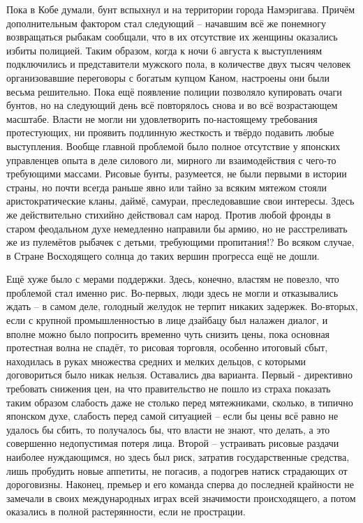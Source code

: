 Пока в Кобе думали, бунт вспыхнул и на территории города Намэригава. Причём дополнительным фактором стал следующий – начавшим всё же понемногу возвращаться рыбакам сообщали, что в их отсутствие их женщины оказались избиты полицией. Таким образом, когда к ночи 6 августа к выступлениям подключились и представители мужского пола, в количестве двух тысяч человек организовавшие переговоры с богатым купцом Каном, настроены они были весьма решительно. Пока ещё появление полиции позволяло купировать очаги бунтов, но на следующий день всё повторялось снова и во всё возрастающем масштабе. Власти не могли ни удовлетворить по-настоящему требования протестующих, ни проявить подлинную жесткость и твёрдо подавить любые выступления. Вообще главной проблемой было полное отсутствие у японских управленцев опыта в деле силового ли, мирного ли взаимодействия с чего-то требующими массами. Рисовые бунты, разумеется, не были первыми в истории страны, но почти всегда раньше явно или тайно за всяким мятежом стояли аристократические кланы, даймё, самураи, преследовавшие свои интересы. Здесь же действительно стихийно действовал сам народ. Против любой фронды в старом феодальном духе немедленно направили бы армию, но не расстреливать же из пулемётов рыбачек с детьми, требующими пропитания!? Во всяком случае, в Стране Восходящего солнца до таких вершин прогресса ещё не дошли.

Ещё хуже было с мерами поддержки. Здесь, конечно, властям не повезло, что проблемой стал именно рис. Во-первых, люди здесь не могли и отказывались ждать – в самом деле, голодный желудок не терпит никаких задержек. Во-вторых, если с крупной промышленностью в лице дзайбацу был налажен диалог, и вполне можно было попросить временно чуть снизить цены, пока основная протестная волна не спадёт, то рисовая торговля, особенно итоговый сбыт, находилась в руках множества средних и мелких дельцов, с которыми договориться было никак нельзя. Оставались два варианта. Первый - директивно требовать снижения цен, на что правительство не пошло из страха показать таким образом слабость даже не столько перед мятежниками, сколько, в типично японском духе, слабость перед самой ситуацией – если бы цены всё равно не удалось бы сбить, то получалось бы, что власти не знают, что делать, а это совершенно недопустимая потеря лица. Второй – устраивать рисовые раздачи наиболее нуждающимся, но здесь был риск, затратив государственные средства, лишь пробудить новые аппетиты, не погасив, а подогрев натиск страдающих от дороговизны. Наконец, премьер и его команда сперва до последней крайности не замечали в своих международных играх всей значимости происходящего, а потом оказались в полной растерянности, если не прострации.

